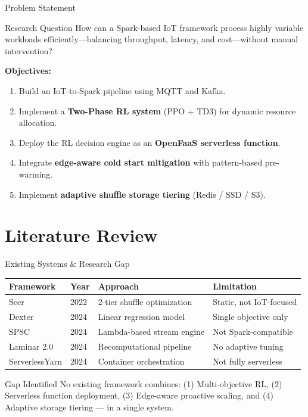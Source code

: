 \documentclass{beamer}
\begin{document}
\begin{frame}{Problem Statement}
\begin{block}{Research Question}
How can a Spark-based IoT framework process highly variable workloads efficiently---balancing throughput, latency, and cost---without manual intervention?
\end{block}
\vspace{0.3cm}
\textbf{Objectives:}
\begin{enumerate}
    \item Build an IoT-to-Spark pipeline using MQTT and Kafka.
    \item Implement a \textbf{Two-Phase RL system} (PPO + TD3) for dynamic resource allocation.
    \item Deploy the RL decision engine as an \textbf{OpenFaaS serverless function}.
    \item Integrate \textbf{edge-aware cold start mitigation} with pattern-based pre-warming.
    \item Implement \textbf{adaptive shuffle storage tiering} (Redis / SSD / S3).
\end{enumerate}
\end{frame}

\section{Literature Review}

\begin{frame}{Existing Systems \& Research Gap}
\begin{table}
\footnotesize
\begin{tabular}{|l|l|l|l|}
\hline
\textbf{Framework} & \textbf{Year} & \textbf{Approach} & \textbf{Limitation} \\
\hline
Seer & 2022 & 2-tier shuffle optimization & Static, not IoT-focused \\
Dexter & 2024 & Linear regression model & Single objective only \\
SPSC & 2024 & Lambda-based stream engine & Not Spark-compatible \\
Laminar 2.0 & 2024 & Recomputational pipeline & No adaptive tuning \\
ServerlessYarn & 2024 & Container orchestration & Not fully serverless \\
\hline
\end{tabular}
\end{table}
\vspace{0.3cm}
\begin{alertblock}{Gap Identified}
No existing framework combines: (1) Multi-objective RL, (2) Serverless function deployment, (3) Edge-aware proactive scaling, and (4) Adaptive storage tiering --- in a single system.
\end{alertblock}
\end{frame}
\end{document}
